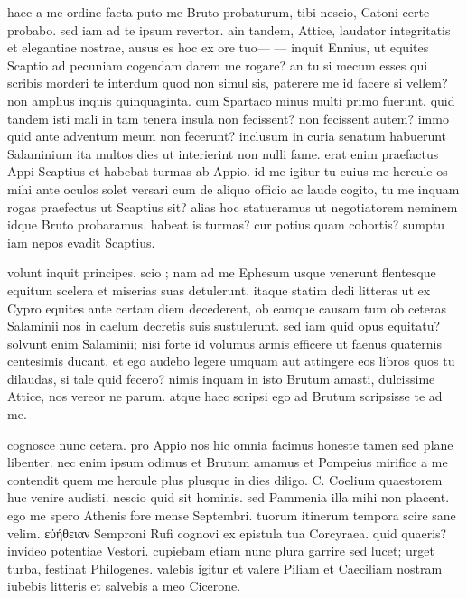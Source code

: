  haec a me ordine facta puto me Bruto probaturum, tibi nescio, Catoni certe probabo. sed iam ad te ipsum revertor. ain tandem, Attice, laudator integritatis et elegantiae nostrae, ausus es hoc ex ore tuo— — inquit Ennius, ut equites Scaptio ad pecuniam cogendam darem me rogare? an tu si mecum esses qui scribis morderi te interdum quod non simul sis, paterere me id facere si vellem? non amplius inquis quinquaginta. cum Spartaco minus multi primo fuerunt. quid tandem isti mali in tam tenera insula non fecissent? non fecissent autem? immo quid ante adventum meum non fecerunt? inclusum in curia senatum habuerunt Salaminium ita multos dies ut interierint non nulli fame. erat enim praefactus Appi Scaptius et habebat turmas ab Appio. id me igitur tu cuius me hercule os mihi ante oculos solet versari cum de aliquo officio ac laude cogito, tu me inquam rogas praefectus ut Scaptius sit? alias hoc statueramus ut negotiatorem neminem idque Bruto probaramus. habeat is turmas? cur potius quam cohortis? sumptu iam nepos evadit Scaptius.

 volunt inquit principes. scio ; nam ad me Ephesum usque venerunt flentesque equitum scelera et miserias suas detulerunt. itaque statim dedi litteras ut ex Cypro equites ante certam diem decederent, ob eamque causam tum ob ceteras Salaminii nos in caelum decretis suis sustulerunt. sed iam quid opus equitatu? solvunt enim Salaminii; nisi forte id volumus armis efficere ut faenus quaternis centesimis ducant. et ego audebo legere umquam aut attingere eos libros quos tu dilaudas, si tale quid fecero? nimis inquam in isto Brutum amasti, dulcissime Attice, nos vereor ne parum. atque haec scripsi ego ad Brutum scripsisse te ad me.

 cognosce nunc cetera. pro Appio nos hic omnia facimus honeste tamen sed plane libenter. nec enim ipsum odimus et Brutum amamus et Pompeius mirifice a me contendit quem me hercule plus plusque in dies diligo. C. Coelium quaestorem huc venire audisti. nescio quid sit hominis. sed Pammenia illa mihi non placent. ego me spero Athenis fore mense Septembri. tuorum itinerum tempora scire sane velim. εὐήθειαν Semproni Rufi cognovi ex epistula tua Corcyraea. quid quaeris? invideo potentiae Vestori. cupiebam etiam nunc plura garrire sed lucet; urget turba, festinat Philogenes. valebis igitur et valere Piliam et Caeciliam nostram iubebis litteris et salvebis a meo Cicerone.
